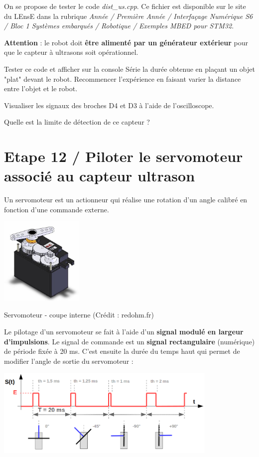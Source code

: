 \documentclass[a4paper,11pt,titlepage]{article} %
\begin{document}
On se propose de tester le code \textsl{dist\_us.cpp}. Ce fichier est disponible sur le site du LEnsE dans la rubrique \textit{Année / Première Année / Interfaçage Numérique S6 / Bloc 1 Systèmes embarqués / Robotique / Exemples MBED pour STM32}.

\textbf{Attention} : le robot doit \textbf{être alimenté par un générateur extérieur} pour que le capteur à ultrasons soit opérationnel.

\Manip Tester ce code et afficher sur la console Série la durée obtenue en  plaçant un objet "plat" devant le robot. Recommencer l'expérience en faisant varier la distance entre l'objet et le robot.

\Manip Visualiser les signaux des broches D4 et D3 à l'aide de l'oscilloscope.

\Quest Quelle est la limite de détection de ce capteur ?

\newpage
\section{Etape 12 / Piloter le servomoteur associé au capteur ultrason}

Un servomoteur est un actionneur qui réalise une rotation d'un angle calibré en fonction d'une commande externe.

\begin{center}
	\includegraphics[width=0.3\textwidth]{images/MINE_Nucleo_servomoteur-redohm.jpg}
	
	Servomoteur - coupe interne (Crédit : redohm.fr)
\end{center}

Le pilotage d'un servomoteur se fait à l'aide d'un \textbf{signal modulé en largeur d'impulsions}. Le signal de commande est un \textbf{signal rectangulaire} (numérique) de période fixée à 20 ms. C'est ensuite la durée du temps haut qui permet de modifier l'angle de sortie du servomoteur :

\begin{center}
	\includegraphics[width=0.8\textwidth]{images/MINE_Nucleo_servomoteur.png}
\end{center}
\end{document}
